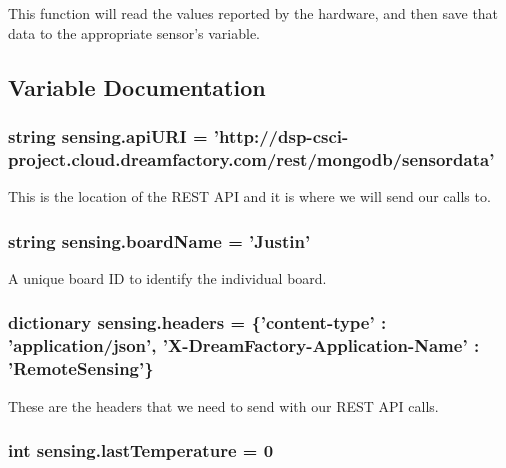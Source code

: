 This function will read the values reported by the hardware, and then save that data to the appropriate sensor's variable. 



\subsection{Variable Documentation}
\hypertarget{namespacesensing_a5de0b501e0135c4f0709266d12fa2814}{
\subsubsection[{api\-U\-R\-I}]{\setlength{\rightskip}{0pt plus 5cm}string sensing.\-api\-U\-R\-I = 'http\-://dsp-\/csci-\/project.\-cloud.\-dreamfactory.\-com/rest/mongodb/sensordata'}}\label{namespacesensing_a5de0b501e0135c4f0709266d12fa2814}


This is the location of the R\-E\-S\-T A\-P\-I and it is where we will send our calls to. 

\hypertarget{namespacesensing_a7d59d9b021482661d93cbf2120dfa030}{
\subsubsection[{board\-Name}]{\setlength{\rightskip}{0pt plus 5cm}string sensing.\-board\-Name = 'Justin'}}\label{namespacesensing_a7d59d9b021482661d93cbf2120dfa030}


A unique board I\-D to identify the individual board. 

\hypertarget{namespacesensing_a10bdd4ea61df5e84854a462509e3c7d5}{
\subsubsection[{headers}]{\setlength{\rightskip}{0pt plus 5cm}dictionary sensing.\-headers = \{'content-\/type' \-: 'application/json', 'X-\/Dream\-Factory-\/Application-\/Name' \-: 'Remote\-Sensing'\}}}\label{namespacesensing_a10bdd4ea61df5e84854a462509e3c7d5}


These are the headers that we need to send with our R\-E\-S\-T A\-P\-I calls. 

\hypertarget{namespacesensing_a299f408c66c5c07e7eb2392a01472dd7}{
\subsubsection[{last\-Temperature}]{\setlength{\rightskip}{0pt plus 5cm}int sensing.\-last\-Temperature = 0}}\label{namespacesensing_a299f408c66c5c07e7eb2392a01472dd7}


